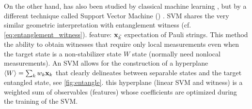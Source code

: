 \documentclass[
reprint,
aps,
pra,
floatfix,
]{revtex4-2}
\theoremstyle{plain}
\theoremstyle{definition}
\newtheorem{remark}{Remark}
\newcommand{\ew}{W}
\begin{document}


On the other hand,  has also been studied by classical machine learning \cite{zhuMachineLearningDerivedEntanglement2021}  \cite{vintskevichClassificationFourqubitEntangled2022}, 
but by a different technique called Support Vector Machine ()  \cite{cortesSupportvectorNetworks1995}.
SVM shares the very similar geometric interpretation with entanglement witness (cf. \cref{eq:entanglement_witness}).
feature: $\vb{x}_{\vec{k}}$ expectation of Pauli strings.
This method the ability to obtain witnesses that require only local measurements even when the target state is a non-stabilizer state $W$ state (normally need nonlocal measurements).
An SVM allows for the construction of a hyperplane $\expval{\ew}=\sum_k w_k \vbx_{k}$ that clearly delineates between separable states and the target entangled state, see \cref{fig:entangle}.
this hyperplane (linear SVM and witness) is a weighted sum of observables (features) whose coefficients are optimized during the training of the SVM.
\end{document}
